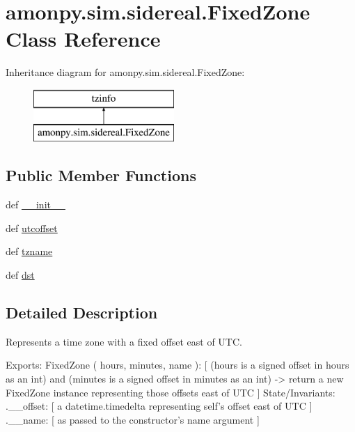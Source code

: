 \hypertarget{classamonpy_1_1sim_1_1sidereal_1_1_fixed_zone}{\section{amonpy.\-sim.\-sidereal.\-Fixed\-Zone Class Reference}
\label{classamonpy_1_1sim_1_1sidereal_1_1_fixed_zone}
}
Inheritance diagram for amonpy.\-sim.\-sidereal.\-Fixed\-Zone\-:\begin{figure}[H]
\begin{center}
\leavevmode
\includegraphics[height=2.000000cm]{classamonpy_1_1sim_1_1sidereal_1_1_fixed_zone}
\end{center}
\end{figure}
\subsection*{Public Member Functions}
\begin{DoxyCompactItemize}
\item 
def \hyperlink{classamonpy_1_1sim_1_1sidereal_1_1_fixed_zone_a4b1001f54b5a79fd3d4e36d22d6b1773}{\-\_\-\-\_\-init\-\_\-\-\_\-}
\item 
def \hyperlink{classamonpy_1_1sim_1_1sidereal_1_1_fixed_zone_a259dc7d17941495116721e9ad5aa75a5}{utcoffset}
\item 
def \hyperlink{classamonpy_1_1sim_1_1sidereal_1_1_fixed_zone_a71498be1686ee252280e0aab5585c56b}{tzname}
\item 
def \hyperlink{classamonpy_1_1sim_1_1sidereal_1_1_fixed_zone_a5a37ebf256e2dc3233aaf05c19a2f84d}{dst}
\end{DoxyCompactItemize}


\subsection{Detailed Description}
\begin{DoxyVerb}Represents a time zone with a fixed offset east of UTC.

  Exports:
    FixedZone ( hours, minutes, name ):
      [ (hours is a signed offset in hours as an int) and
        (minutes is a signed offset in minutes as an int) ->
          return a new FixedZone instance representing
          those offsets east of UTC ]
  State/Invariants:
    .__offset:
      [ a datetime.timedelta representing self's offset
        east of UTC ]
    .__name:
      [ as passed to the constructor's name argument ]
\end{DoxyVerb}
 


